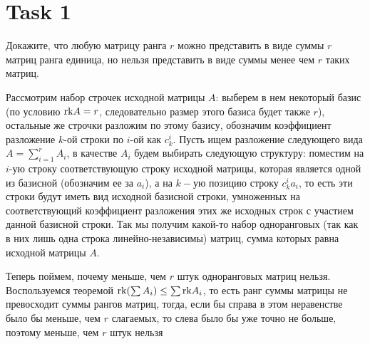 \section{Task 1}
\begin{task}
    Докажите, что любую матрицу ранга $r$ можно представить в виде суммы $r$ матриц ранга единица, но нельзя представить в виде суммы менее чем $r$ таких матриц.
\end{task}

\begin{solution}
    Рассмотрим набор строчек исходной матрицы $A$: выберем в нем некоторый базис (по условию $\text{rk} A = r$, следовательно размер этого базиса будет также $r$), остальные же строчки разложим по этому базису, обозначим коэффициент разложение $k$-ой строки по $i$-ой как $c^i_{k}$.
    Пусть ищем разложение следующего вида $A = \sum\limits_{i=1}^r A_i$, в качестве $A_i$ будем выбирать следующую структуру: поместим на $i$-ую строку соответствующую строку исходной матрицы, которая является одной из базисной (обозначим ее за $a_i$), а на $k-ую$ позицию строку $c^i_k a_i$, то есть эти строки будут иметь вид исходной базисной строки, умноженных на соответствующий коэффициент разложения этих же исходных строк с участием данной базисной строки.
    Так мы получим какой-то набор одноранговых (так как в них лишь одна строка линейно-независимы) матриц, сумма которых равна исходной матрицы $A$.

    Теперь поймем, почему меньше, чем $r$ штук одноранговых матриц нельзя.
    Воспользуемся теоремой $\text{rk} (\sum A_i) \leq \sum \text{rk} A_i$, то есть ранг суммы матрицы не превосходит суммы рангов матриц, тогда, если бы справа в этом неравенстве было бы меньше, чем $r$ слагаемых, то слева было бы уже точно не больше, поэтому меньше, чем $r$ штук нельзя
\end{solution}